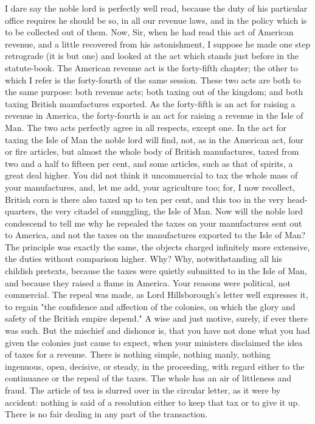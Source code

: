 I dare say the noble lord is perfectly well read, because the duty of his particular office requires he should be so, in all our revenue laws, and in the policy which is to be collected out of them. Now, Sir, when he had read this act of American revenue, and a little recovered from his astonishment, I suppose he made one step retrograde (it is but one) and looked at the act which stands just before in the statute-book. The American revenue act is the forty-fifth chapter; the other to which I refer is the forty-fourth of the same session. These two acts are both to the same purpose: both revenue acts; both taxing out of the kingdom; and both taxing British manufactures exported. As the forty-fifth is an act for raising a revenue in America, the forty-fourth is an act for raising a revenue in the Isle of Man. The two acts perfectly agree in all respects, except one. In the act for taxing the Isle of Man the noble lord will find, not, as in the American act, four or fire articles, but almost the whole body of British manufactures, taxed from two and a half to fifteen per cent, and some articles, such as that of spirits, a great deal higher. You did not think it uncommercial to tax the whole mass of your manufactures, and, let me add, your agriculture too; for, I now recollect, British corn is there also taxed up to ten per cent, and this too in the very head-quarters, the very citadel of smuggling, the Isle of Man. Now will the noble lord condescend to tell me why he repealed the taxes on your manufactures sent out to America, and not the taxes on the manufactures exported to the Isle of Man? The principle was exactly the same, the objects charged infinitely more extensive, the duties without comparison higher. Why? Why, notwithstanding all his childish pretexts, because the taxes were quietly submitted to in the Isle of Man, and because they raised a flame in America. Your reasons were political, not commercial. The repeal was made, as Lord Hillsborough's letter well expresses it, to regain "the confidence and affection of the colonies, on which the glory and safety of the British empire depend." A wise and just motive, surely, if ever there was such. But the mischief and dishonor is, that you have not done what you had given the colonies just cause to expect, when your ministers disclaimed the idea of taxes for a revenue. There is nothing simple, nothing manly, nothing ingenuous, open, decisive, or steady, in the proceeding, with regard either to the continuance or the repeal of the taxes. The whole has an air of littleness and fraud. The article of tea is slurred over in the circular letter, as it were by accident: nothing is said of a resolution either to keep that tax or to give it up. There is no fair dealing in any part of the transaction.

